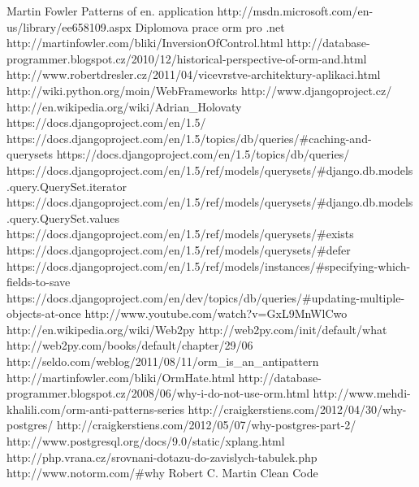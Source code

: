 \documentclass[ing,male,java,dept456]{diploma}						%
\begin{document}
\begin{thebibliography}{99}

 Martin Fowler Patterns of en. application
 http://msdn.microsoft.com/en-us/library/ee658109.aspx
 Diplomova prace orm pro .net
 http://martinfowler.com/bliki/InversionOfControl.html
 http://database-programmer.blogspot.cz/2010/12/historical-perspective-of-orm-and.html
 http://www.robertdresler.cz/2011/04/vicevrstve-architektury-aplikaci.html
 http://wiki.python.org/moin/WebFrameworks
 http://www.djangoproject.cz/
 http://en.wikipedia.org/wiki/Adrian\_Holovaty
 https://docs.djangoproject.com/en/1.5/
 https://docs.djangoproject.com/en/1.5/topics/db/queries/\#caching-and-querysets
 https://docs.djangoproject.com/en/1.5/topics/db/queries/
 https://docs.djangoproject.com/en/1.5/ref/models/querysets/\#django.db.models.query.QuerySet.iterator
 https://docs.djangoproject.com/en/1.5/ref/models/querysets/\#django.db.models.query.QuerySet.values
 https://docs.djangoproject.com/en/1.5/ref/models/querysets/\#exists
 https://docs.djangoproject.com/en/1.5/ref/models/querysets/\#defer
 https://docs.djangoproject.com/en/1.5/ref/models/instances/\#specifying-which-fields-to-save
 https://docs.djangoproject.com/en/dev/topics/db/queries/\#updating-multiple-objects-at-once
 http://www.youtube.com/watch?v=GxL9MnWlCwo
 http://en.wikipedia.org/wiki/Web2py
 http://web2py.com/init/default/what
 http://web2py.com/books/default/chapter/29/06
 http://seldo.com/weblog/2011/08/11/orm\_is\_an\_antipattern
 http://martinfowler.com/bliki/OrmHate.html
 http://database-programmer.blogspot.cz/2008/06/why-i-do-not-use-orm.html
 http://www.mehdi-khalili.com/orm-anti-patterns-series
 http://craigkerstiens.com/2012/04/30/why-postgres/
 http://craigkerstiens.com/2012/05/07/why-postgres-part-2/
 http://www.postgresql.org/docs/9.0/static/xplang.html
 http://php.vrana.cz/srovnani-dotazu-do-zavislych-tabulek.php
 http://www.notorm.com/\#why
 Robert C. Martin Clean Code
\end{thebibliography}
\end{document}
